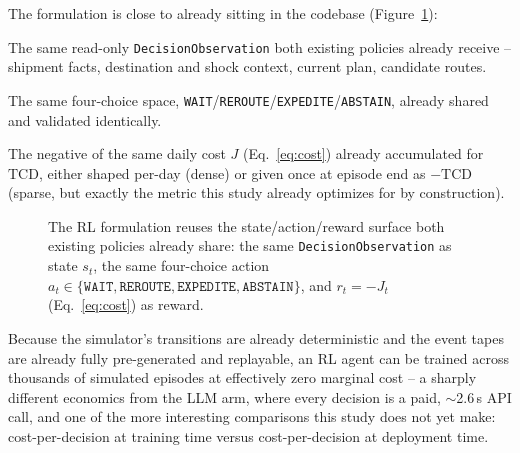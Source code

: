 \documentclass[10pt,twocolumn]{article}
\newcommand{\tcd}{\ensuremath{\mathrm{TCD}}}
\begin{document}
The formulation is close to already sitting in the codebase (Figure~\ref{fig:rlloop}):

\begin{description}[leftmargin=1.2em,style=unboxed]
\item[State.] The same read-only \texttt{DecisionObservation} both existing policies already receive -- shipment facts, destination and shock context, current plan, candidate routes.
\item[Action.] The same four-choice space, \texttt{WAIT}/\texttt{REROUTE}/\texttt{EXPEDITE}/\texttt{ABSTAIN}, already shared and validated identically.
\item[Reward.] The negative of the same daily cost $J$ (Eq.~\ref{eq:cost}) already accumulated for $\tcd$, either shaped per-day (dense) or given once at episode end as $-\tcd$ (sparse, but exactly the metric this study already optimizes for by construction).
\end{description}

\begin{figure}[t]
\centering
{}
\caption{The RL formulation reuses the state/action/reward surface both existing policies already share: the same \texttt{DecisionObservation} as state $s_t$, the same four-choice action $a_t \in \{\texttt{WAIT},\texttt{REROUTE},\texttt{EXPEDITE},\texttt{ABSTAIN}\}$, and $r_t=-J_t$ (Eq.~\ref{eq:cost}) as reward.}
\label{fig:rlloop}
\end{figure}

Because the simulator's transitions are already deterministic and the event tapes are already fully pre-generated and replayable, an RL agent can be trained across thousands of simulated episodes at effectively zero marginal cost -- a sharply different economics from the LLM arm, where every decision is a paid, $\sim$2.6\,s API call, and one of the more interesting comparisons this study does not yet make: cost-per-decision at training time versus cost-per-decision at deployment time.
\end{document}
